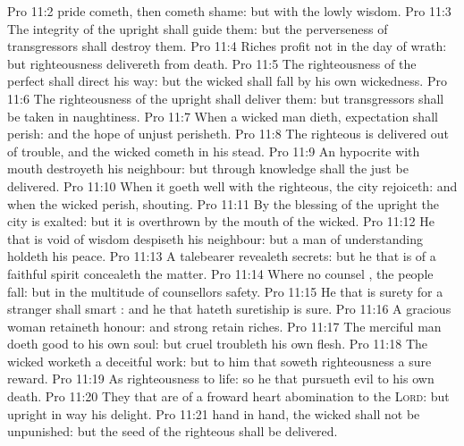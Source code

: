 \vs Pro 11:2  pride cometh, then cometh shame: but with the lowly  wisdom.
\vs Pro 11:3 The integrity of the upright shall guide them: but the perverseness of transgressors shall destroy them.
\vs Pro 11:4 Riches profit not in the day of wrath: but righteousness delivereth from death.
\vs Pro 11:5 The righteousness of the perfect shall direct his way: but the wicked shall fall by his own wickedness.
\vs Pro 11:6 The righteousness of the upright shall deliver them: but transgressors shall be taken in  naughtiness.
\vs Pro 11:7 When a wicked man dieth,  expectation shall perish: and the hope of unjust  perisheth.
\vs Pro 11:8 The righteous is delivered out of trouble, and the wicked cometh in his stead.
\vs Pro 11:9 An hypocrite with  mouth destroyeth his neighbour: but through knowledge shall the just be delivered.
\vs Pro 11:10 When it goeth well with the righteous, the city rejoiceth: and when the wicked perish,  shouting.
\vs Pro 11:11 By the blessing of the upright the city is exalted: but it is overthrown by the mouth of the wicked.
\vs Pro 11:12 He that is void of wisdom despiseth his neighbour: but a man of understanding holdeth his peace.
\vs Pro 11:13 A talebearer revealeth secrets: but he that is of a faithful spirit concealeth the matter.
\vs Pro 11:14 Where no counsel , the people fall: but in the multitude of counsellors  safety.
\vs Pro 11:15 He that is surety for a stranger shall smart : and he that hateth suretiship is sure.
\vs Pro 11:16 A gracious woman retaineth honour: and strong  retain riches.
\vs Pro 11:17 The merciful man doeth good to his own soul: but  cruel troubleth his own flesh.
\vs Pro 11:18 The wicked worketh a deceitful work: but to him that soweth righteousness  a sure reward.
\vs Pro 11:19 As righteousness  to life: so he that pursueth evil  to his own death.
\vs Pro 11:20 They that are of a froward heart  abomination to the \textsc{Lord}: but  upright in  way  his delight.
\vs Pro 11:21  hand  in hand, the wicked shall not be unpunished: but the seed of the righteous shall be delivered.
